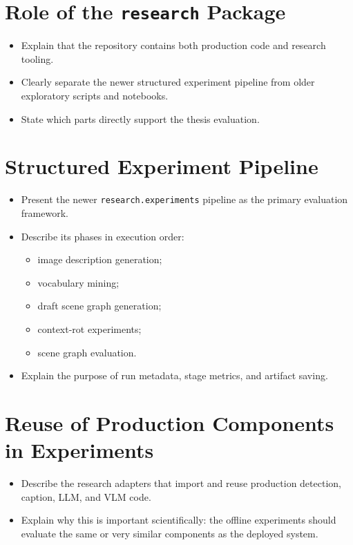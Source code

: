 \documentclass[
  digital,     %
  oneside,     %
  nosansbold,  %
  nocolorbold, %
  lof,         %
  lot,         %
]{fithesis4}
\begin{document}
\section{Role of the \texttt{research} Package}
\begin{itemize}
    \item Explain that the repository contains both production code and research tooling.
    \item Clearly separate the newer structured experiment pipeline from older exploratory scripts and notebooks.
    \item State which parts directly support the thesis evaluation.
\end{itemize}

\section{Structured Experiment Pipeline}
\begin{itemize}
    \item Present the newer \texttt{research.experiments} pipeline as the primary evaluation framework.
    \item Describe its phases in execution order:
    \begin{itemize}
        \item image description generation;
        \item vocabulary mining;
        \item draft scene graph generation;
        \item context-rot experiments;
        \item scene graph evaluation.
    \end{itemize}
    \item Explain the purpose of run metadata, stage metrics, and artifact saving.
\end{itemize}

\section{Reuse of Production Components in Experiments}
\begin{itemize}
    \item Describe the research adapters that import and reuse production detection, caption, LLM, and VLM code.
    \item Explain why this is important scientifically: the offline experiments should evaluate the same or very similar components as the deployed system.
\end{itemize}
\end{document}
